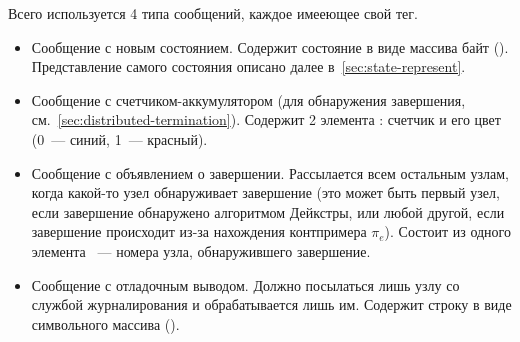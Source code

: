 Всего используется 4 типа сообщений, каждое имееющее свой тег.
\begin{itemize}
\item Сообщение с новым состоянием. Содержит состояние в виде массива байт
  (). Представление самого состояния описано далее
  в~\ref{sec:state-represent}.
\item Сообщение с счетчиком-аккумулятором (для обнаружения завершения,
  см.~\ref{sec:distributed-termination}). Содержит 2 элемента : счетчик и
  его цвет (0~--- синий, 1~--- красный).
\item Сообщение с объявлением о завершении. Рассылается всем остальным узлам, когда
  какой-то узел обнаруживает завершение (это может быть первый узел, если завершение
  обнаружено алгоритмом Дейкстры, или любой другой, если завершение происходит из-за
  нахождения контпримера $\pi_e$). Состоит из одного элемента ~--- номера
  узла, обнаружившего завершение.
\item Сообщение с отладочным выводом. Должно посылаться лишь узлу со службой
  журналирования и обрабатывается лишь им. Содержит строку в виде символьного массива
  ().
\end{itemize}

